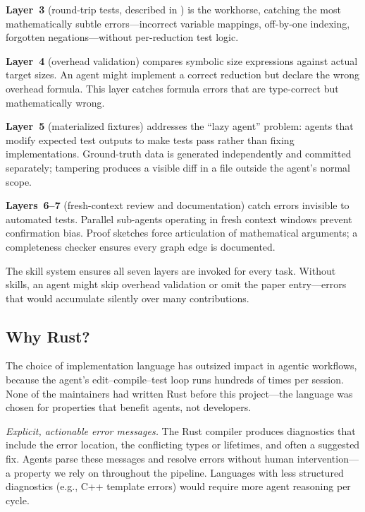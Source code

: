 \documentclass[conference]{IEEEtran}
\begin{document}
\textbf{Layer~3} (round-trip tests, described in ) is the workhorse, catching the most mathematically subtle errors---incorrect variable mappings, off-by-one indexing, forgotten negations---without per-reduction test logic.

\textbf{Layer~4} (overhead validation) compares symbolic size expressions against actual target sizes.
An agent might implement a correct reduction but declare the wrong overhead formula.
This layer catches formula errors that are type-correct but mathematically wrong.

\textbf{Layer~5} (materialized fixtures) addresses the ``lazy agent'' problem: agents that modify expected test outputs to make tests pass rather than fixing implementations.
Ground-truth data is generated independently and committed separately; tampering produces a visible diff in a file outside the agent's normal scope.

\textbf{Layers~6--7} (fresh-context review and documentation) catch errors invisible to automated tests.
Parallel sub-agents operating in fresh context windows prevent confirmation bias.
Proof sketches force articulation of mathematical arguments; a completeness checker ensures every graph edge is documented.

The skill system ensures all seven layers are invoked for every task.
Without skills, an agent might skip overhead validation or omit the paper entry---errors that would accumulate silently over many contributions.

\subsection{Why Rust?}\label{sec:why-rust}

The choice of implementation language has outsized impact in agentic workflows, because the agent's edit--compile--test loop runs hundreds of times per session.
None of the maintainers had written Rust before this project---the language was chosen for properties that benefit agents, not developers.

\emph{Explicit, actionable error messages.}
The Rust compiler produces diagnostics that include the error location, the conflicting types or lifetimes, and often a suggested fix.
Agents parse these messages and resolve errors without human intervention---a property we rely on throughout the pipeline.
Languages with less structured diagnostics (e.g., C++ template errors) would require more agent reasoning per cycle.
\end{document}
